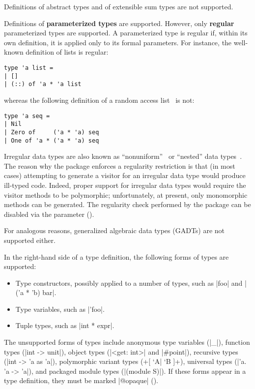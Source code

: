 \documentclass[11pt,a4paper,twoside]{article}
\renewcommand{\emph}[1]{\textbf{#1}}
\begin{document}
Definitions of abstract types and of extensible sum types are not supported.

\label{sec:regularity}

Definitions of \emph{parameterized types} are supported. However, only
\emph{regular} parameterized types are supported. A parameterized type is
regular if, within its own definition, it is applied only to its formal
parameters. For instance, the well-known definition of lists is regular:

\begin{origenv}
\begin{lstlisting}
type 'a list =
| []
| (::) of 'a * 'a list
\end{lstlisting}
\end{origenv}

whereas the following definition of a random access
list~\cite[\S10.1.2]{okasaki-book-99} is not:

\begin{origenv}
\begin{lstlisting}
type 'a seq =
| Nil
| Zero of     ('a * 'a) seq
| One of 'a * ('a * 'a) seq
\end{lstlisting}
\end{origenv}

Irregular data types are also known as
``nonuniform''~\cite[\S10.1]{okasaki-book-99} or ``nested'' data
types~\cite{bird-meertens-98}.
%
The reason why the \visitors package enforces a regularity restriction is that
(in most cases) attempting to generate a visitor for an irregular data type
would produce ill-typed code. Indeed, proper support for irregular data types
would require the visitor methods to be polymorphic; unfortunately, at
present, only monomorphic methods can be generated.
%
The regularity check performed by the \visitors package can be disabled via
the \irregular parameter ().

For analogous reasons, generalized algebraic data types (GADTs) are not
supported either.

In the right-hand side of a type definition, the following forms of types are
supported:
\begin{itemize}
\item Type constructors, possibly applied to a number of types, such as
  \oc|foo| and \oc|('a * 'b) bar|.
\item Type variables, such as \oc|'foo|.
\item Tuple types, such as \oc|int * expr|.
\end{itemize}
The unsupported forms of types include
anonymous type variables (\oc|_|),
function types (\oc|int -> unit|),
object types (\oc|<get: int>| and \oc|#point|),
recursive types (\oc|int -> 'a as 'a|),
polymorphic variant types (\oc+[ `A| `B ]+),
universal types (\oc|'a. 'a -> 'a|),
and
packaged module types (\oc|(module S)|).
If these forms appear in a type definition,
they must be marked \oc|@opaque| ().
\end{document}
